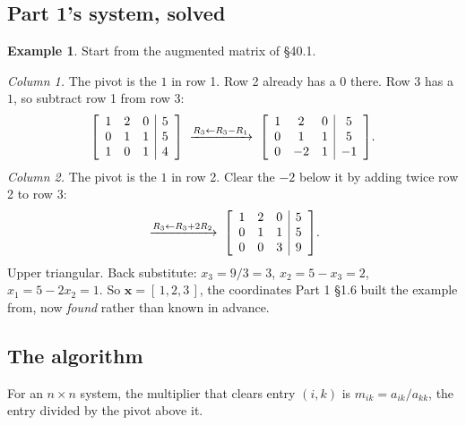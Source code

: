 \documentclass[11pt]{article}
\theoremstyle{plain}
\theoremstyle{definition}
\newtheorem{ex}{Example}[section]
\theoremstyle{remark}
\newcommand{\vc}[1]{\mathbf{#1}}
\newenvironment{aug}[1]{\left[\begin{array}{#1}}{\end{array}\right]}
\begin{document}
\subsection{Part 1's system, solved}
\begin{ex}
\label{ex:part1}
Start from the augmented matrix of \S40.1.

\emph{Column 1.} The pivot is the $1$ in row 1. Row 2 already has a $0$ there.
Row 3 has a $1$, so subtract row 1 from row 3:
\[
  \begin{aug}{ccc|c}1&2&0&5\\0&1&1&5\\1&0&1&4\end{aug}
  \;\xrightarrow{R_3\gets R_3-R_1}\;
  \begin{aug}{ccc|c}1&2&0&5\\0&1&1&5\\0&-2&1&-1\end{aug}.
\]
\emph{Column 2.} The pivot is the $1$ in row 2. Clear the $-2$ below it by adding
twice row 2 to row 3:
\[
  \;\xrightarrow{R_3\gets R_3+2R_2}\;
  \begin{aug}{ccc|c}1&2&0&5\\0&1&1&5\\0&0&3&9\end{aug}.
\]
Upper triangular. Back substitute: $x_3=9/3=3$, $x_2=5-x_3=2$,
$x_1=5-2x_2=1$. So $\vc{x}=[\,1,2,3\,]$, the coordinates Part 1 \S1.6 built the
example from, now \emph{found} rather than known in advance.
\end{ex}

\subsection{The algorithm}
For an $n\times n$ system, the multiplier that clears entry $(i,k)$ is
$m_{ik}=a_{ik}/a_{kk}$, the entry divided by the pivot above it.
\end{document}
